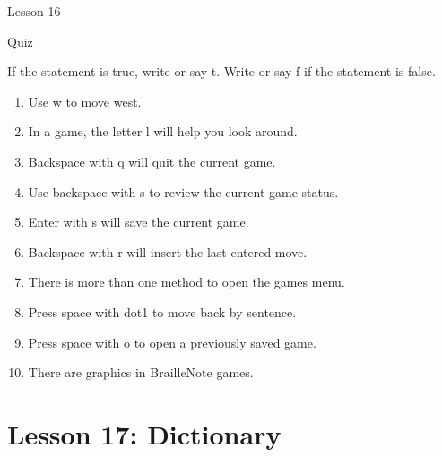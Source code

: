 \documentclass[10pt,letterpaper,twoside]{report}
\begin{document}
{{{{\begin{enumerate}
	      
	      
	      
	      
	      \clearpage
	      
	      \newpage
	      Lesson 16
	      
	      Quiz
	      
	      
	      
	      If the statement is true, write or say t.  Write or say f if the statement is false.
	      
	      
	      
	      \begin{enumerate}
		      \item Use w to move west.
		            
		      \item In a game, the letter l will help you look around.
		            
		      \item Backspace with q will quit the current game.
		            
		      \item Use backspace with s to review the current game status.
		            
		      \item Enter with s will save the current game.
		            
		      \item Backspace with r will insert the last entered move.
		            
		      \item There is more than one method to open the games menu.
		            
		      \item Press space with dot1 to move back by sentence.
		            
		      \item Press space with o to open a previously saved game.
		            
		      \item There are graphics in BrailleNote games.
	      \end{enumerate}
	      
	      
	      
	      
\end{enumerate}\section*{Lesson 17: Dictionary}


}}}}
\end{document}

